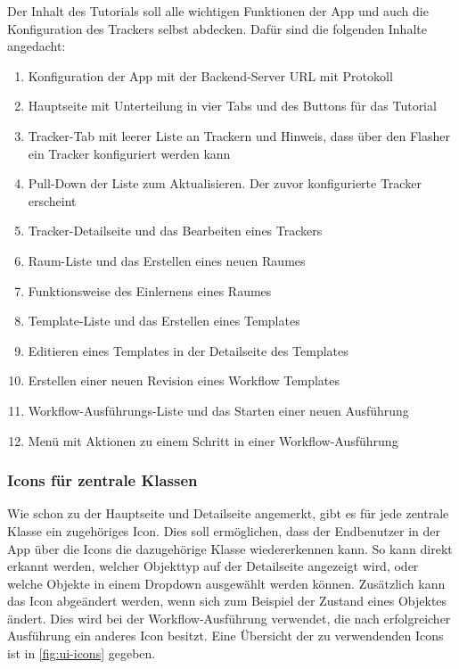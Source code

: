 \FloatBarrier

Der Inhalt des Tutorials soll alle wichtigen Funktionen der App und auch die Konfiguration des Trackers selbst abdecken.
Dafür sind die folgenden Inhalte angedacht:

\begin{enumerate}
	\item Konfiguration der App mit der Backend-Server URL mit Protokoll
	\item Hauptseite mit Unterteilung in vier Tabs und des Buttons für das Tutorial
	\item Tracker-Tab mit leerer Liste an Trackern und Hinweis, dass über den Flasher ein Tracker konfiguriert werden kann
	\item Pull-Down der Liste zum Aktualisieren. Der zuvor konfigurierte Tracker erscheint
	\item Tracker-Detailseite und das Bearbeiten eines Trackers
	\item Raum-Liste und das Erstellen eines neuen Raumes
	\item Funktionsweise des Einlernens eines Raumes
	\item Template-Liste und das Erstellen eines Templates
	\item Editieren eines Templates in der Detailseite des Templates
	\item Erstellen einer neuen Revision eines Workflow Templates
	\item Workflow-Ausführungs-Liste und das Starten einer neuen Ausführung
	\item Menü mit Aktionen zu einem Schritt in einer Workflow-Ausführung
\end{enumerate}

\subsubsection{Icons für zentrale Klassen}

Wie schon zu der Hauptseite und Detailseite angemerkt, gibt es für jede zentrale Klasse ein zugehöriges Icon.
Dies soll ermöglichen, dass der Endbenutzer in der App über die Icons die dazugehörige Klasse wiedererkennen kann.
So kann direkt erkannt werden, welcher Objekttyp auf der Detailseite angezeigt wird, oder welche
Objekte in einem Dropdown ausgewählt werden können.
Zusätzlich kann das Icon abgeändert werden, wenn sich zum Beispiel der Zustand eines Objektes ändert.
Dies wird bei der Workflow-Ausführung verwendet, die nach erfolgreicher Ausführung ein anderes Icon besitzt.
Eine Übersicht der zu verwendenden Icons ist in \autoref{fig:ui-icons} gegeben.


